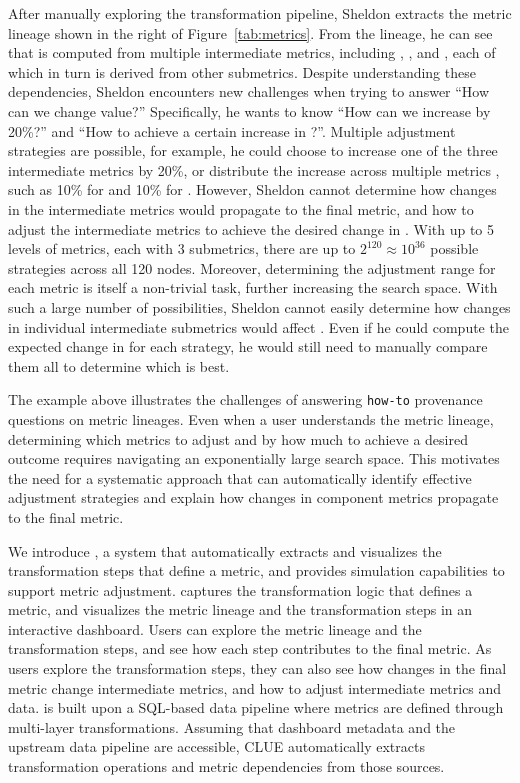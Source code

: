\begin{example}
After manually exploring the transformation pipeline, Sheldon extracts the
metric lineage shown in the right of Figure~\ref{tab:metrics}. From the
 lineage, he can see that  is computed from multiple
intermediate metrics, including ,
, and , each of which in
turn is derived from other submetrics.
%
Despite understanding these dependencies, Sheldon encounters new challenges when
trying to answer ``How can we change  value?'' Specifically, he
wants to know ``How can we increase  by 20\%?'' and ``How to
achieve a certain increase in ?''.  Multiple adjustment strategies
are possible, for example, he could choose to increase one of the three
intermediate metrics by 20\%, or distribute the increase across multiple metrics
, such as 10\% for  and 10\% for .
However, Sheldon cannot determine how changes in the intermediate metrics would
propagate to the final metric, and how to adjust the intermediate metrics to
achieve the desired change in . 
%
With up to 5 levels of metrics, each with 3 submetrics, there are up to $2^{120}
\approx 10^{36}$ possible strategies across all 120 nodes. Moreover, determining
the adjustment range for each metric is itself a non-trivial task, further
increasing the search space. With such a large number of possibilities, Sheldon
cannot easily determine how changes in individual intermediate submetrics would
affect . Even if he could compute the expected change in
 for each strategy, he would still need to manually compare them
all to determine which is best.
\end{example}

The example above illustrates the challenges of answering \texttt{how-to}
provenance questions on metric lineages. Even when a user understands the metric
lineage, determining which metrics to adjust and by how much to achieve a
desired outcome requires navigating an exponentially large search space. This
motivates the need for a systematic approach that can automatically identify
effective adjustment strategies and explain how changes in component metrics
propagate to the final metric.

We introduce \clue, a system that automatically extracts and visualizes the
transformation steps that define a metric, and provides simulation capabilities
to support metric adjustment. \clue captures the transformation logic that
defines a metric, and visualizes the metric lineage and the transformation steps
in an interactive dashboard. Users can explore the metric lineage and the
transformation steps, and see how each step contributes to the final metric. As
users explore the transformation steps, they can also see how changes in the
final metric change intermediate metrics, and how to adjust intermediate
metrics and data. \clue is built upon a SQL-based data pipeline where metrics
are defined through multi-layer transformations. Assuming that dashboard
metadata and the upstream data pipeline are accessible, CLUE automatically
extracts transformation operations and metric dependencies from those sources.

